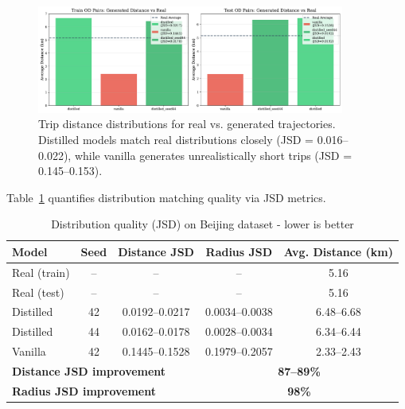 \begin{figure}[h]
    \centering
    \includegraphics[width=0.9\textwidth]{assets/plots/hoser/distance_distributions.pdf}
    \caption{Trip distance distributions for real vs. generated trajectories. Distilled models match real distributions closely (JSD = 0.016--0.022), while vanilla generates unrealistically short trips (JSD = 0.145--0.153).}
    \label{fig:distance-distributions}
\end{figure}

Table~\ref{tab:jsd-results} quantifies distribution matching quality via JSD metrics.

\begin{table}[h]
    \centering
    \caption{Distribution quality (JSD) on Beijing dataset - lower is better}
    \label{tab:jsd-results}
    \small
    \begin{tabular}{lcccc}
        \toprule
        \textbf{Model}                                        & \textbf{Seed}                         & \textbf{Distance JSD} & \textbf{Radius JSD} & \textbf{Avg. Distance (km)} \\
        \midrule
        Real (train)                                          & --                                    & --                    & --                  & 5.16                        \\
        Real (test)                                           & --                                    & --                    & --                  & 5.16                        \\
        \midrule
        Distilled                                             & 42                                    & 0.0192--0.0217        & 0.0034--0.0038      & 6.48--6.68                  \\
        Distilled                                             & 44                                    & 0.0162--0.0178        & 0.0028--0.0034      & 6.34--6.44                  \\
        Vanilla                                               & 42                                    & 0.1445--0.1528        & 0.1979--0.2057      & 2.33--2.43                  \\
        \midrule
        \multicolumn{3}{l}{\textbf{Distance JSD improvement}} & \multicolumn{2}{c}{\textbf{87--89\%}}                                                                             \\
        \multicolumn{3}{l}{\textbf{Radius JSD improvement}}   & \multicolumn{2}{c}{\textbf{98\%}}                                                                                 \\
        \bottomrule
    \end{tabular}
\end{table}


